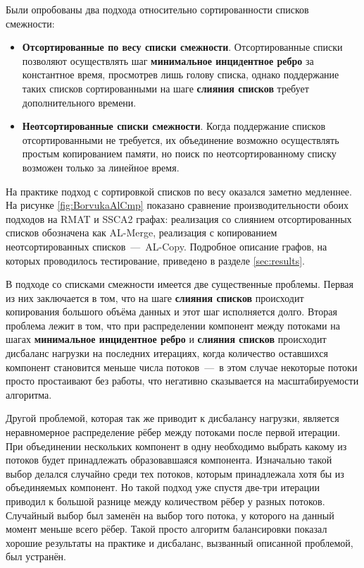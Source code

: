 \documentclass[a4paper,12pt]{extarticle}
\begin{document}
Были опробованы два подхода относительно сортированности списков смежности:
\begin{itemize}
    \item \textbf{Отсортированные по весу списки смежности}. 
        Отсортированные списки позволяют осуществлять шаг \textbf{минимальное инцидентное ребро} за константное время, просмотрев лишь голову списка, однако поддержание таких списков сортированными на шаге \textbf{слияния списков} требует дополнительного времени.
    \item \textbf{Неотсортированные списки смежности}.
        Когда поддержание списков отсортированными не требуется, их объединение возможно осуществлять простым копированием памяти, но поиск по неотсортированному списку возможен только за линейное время.
\end{itemize}

На практике подход с сортировкой списков по весу оказался заметно медленнее. 
На рисунке \ref{fig:BorvukaAlCmp} показано сравнение производительности обоих подходов на RMAT и SSCA2 графах: реализация со слиянием отсортированных списков обозначена как AL-Merge, реализация с копированием неотсортированных списков~---~AL-Copy. Подробное описание графов, на которых проводилось тестирование, приведено в разделе \ref{sec:results}.

В  подходе со списками смежности имеется две существенные проблемы. 
Первая из них заключается в том, что на шаге \textbf{слияния списков} происходит копирования большого объёма данных и этот шаг исполняется долго.
Вторая проблема лежит в том, что при распределении компонент между потоками на шагах \textbf{минимальное инцидентное ребро} и \textbf{слияния списков} происходит дисбаланс нагрузки на последних итерациях, когда количество оставшихся компонент становится меньше числа потоков~---~в этом случае некоторые потоки просто простаивают без работы, что негативно сказывается на масштабируемости алгоритма.

Другой проблемой, которая так же приводит к дисбалансу нагрузки, является неравномерное распределение рёбер между потоками после первой итерации.
При объединении нескольких компонент в одну необходимо выбрать какому из потоков будет принадлежать образовавшаяся компонента.
Изначально такой выбор делался случайно среди тех потоков, которым принадлежала хотя бы из объединяемых компонент.
Но такой подход уже спустя две-три итерации приводил к большой разнице между количеством рёбер у разных потоков.
Случайный выбор был заменён на выбор того потока, у которого на данный момент меньше всего рёбер. Такой просто алгоритм балансировки показал хорошие результаты на практике и дисбаланс, вызванный описанной проблемой, был  устранён.
\end{document}
